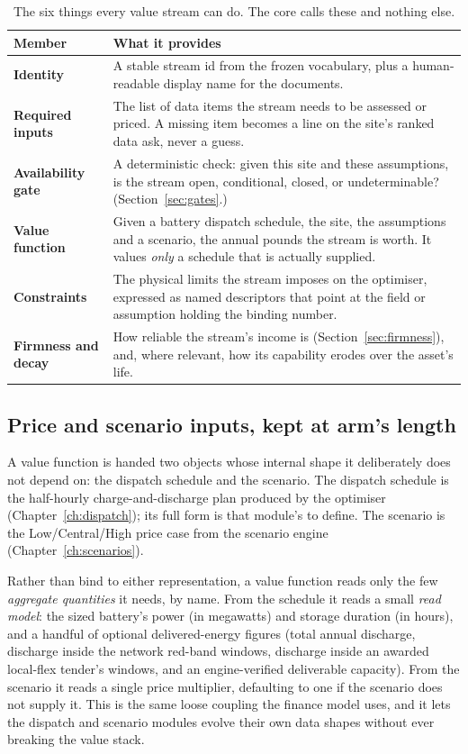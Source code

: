 \begin{table}[H]
\centering
\caption{The six things every value stream can do. The core calls these and nothing else.}
\label{tab:streamiface}
\small\sffamily
\begin{tabularx}{\textwidth}{@{}l L@{}}
\toprule
\textbf{Member} & \textbf{What it provides} \\
\midrule
\textbf{Identity} & A stable stream id from the frozen vocabulary, plus a human-readable display name for the documents. \\
\textbf{Required inputs} & The list of data items the stream needs to be assessed or priced. A missing item becomes a line on the site's ranked data ask, never a guess. \\
\textbf{Availability gate} & A deterministic check: given this site and these assumptions, is the stream open, conditional, closed, or undeterminable? (Section~\ref{sec:gates}.) \\
\textbf{Value function} & Given a battery dispatch schedule, the site, the assumptions and a scenario, the annual pounds the stream is worth. It values \emph{only} a schedule that is actually supplied. \\
\textbf{Constraints} & The physical limits the stream imposes on the optimiser, expressed as named descriptors that point at the field or assumption holding the binding number. \\
\textbf{Firmness and decay} & How reliable the stream's income is (Section~\ref{sec:firmness}), and, where relevant, how its capability erodes over the asset's life. \\
\bottomrule
\end{tabularx}
\end{table}

\subsection{Price and scenario inputs, kept at arm's length}

A value function is handed two objects whose internal shape it deliberately does not depend on: the dispatch schedule and the scenario. The dispatch schedule is the half-hourly charge-and-discharge plan produced by the optimiser (Chapter~\ref{ch:dispatch}); its full form is that module's to define. The scenario is the Low/Central/High price case from the scenario engine (Chapter~\ref{ch:scenarios}).

Rather than bind to either representation, a value function reads only the few \emph{aggregate quantities} it needs, by name. From the schedule it reads a small \emph{read model}: the sized battery's power (in megawatts) and storage duration (in hours), and a handful of optional delivered-energy figures (total annual discharge, discharge inside the network red-band windows, discharge inside an awarded local-flex tender's windows, and an engine-verified deliverable capacity). From the scenario it reads a single price multiplier, defaulting to one if the scenario does not supply it. This is the same loose coupling the finance model uses, and it lets the dispatch and scenario modules evolve their own data shapes without ever breaking the value stack.

